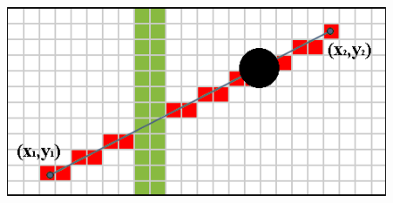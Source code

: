 \documentclass{beamer}
\begin{document}
\begin{frame}
\begin{figure}
\begin{overprint}
						 \includegraphics[width=0.95\linewidth]{graphics/Bresenham_line_4.png}
					\end{overprint}
				\end{figure}

			\end{frame}
\end{document}
